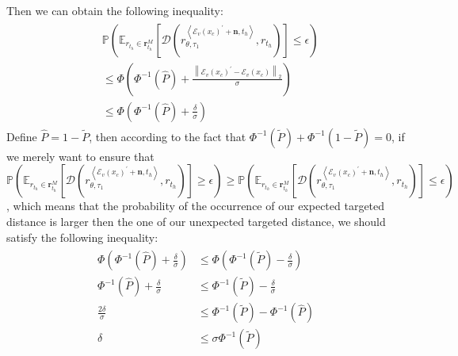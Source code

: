 Then we can obtain the following inequality:
\begin{align}
\begin{split}
&\mathbb{P}(\mathbb{E}_{r_{t_h}\in\mathbf{r}_{t_h}^M}[\mathcal{D}(r_{\theta, \tau_1}^{\left<\mathcal{E}_v(x_c)^{\prime}+\mathbf{n}, t_h\right>}, r_{t_h})]\leq\epsilon)\\&\leq\Phi(\Phi^{-1}(\hat{P})+\frac{\left\|\mathcal{E}_v(x_c)^{\prime}-\mathcal{E}_v(x_c)\right\|_2}{\sigma})\\
&\leq\Phi(\Phi^{-1}(\hat{P})+
\frac{\delta}{\sigma})
\end{split}
\end{align}
Define $\hat{P} = 1 - \tilde{P}$, then according to the fact that $\Phi^{-1}(\tilde{P})+\Phi^{-1}(1-\tilde{P})=0$, if we merely want to ensure that $\mathbb{P}(\mathbb{E}_{r_{t_h}\in\mathbf{r}_{t_h}^M}[\mathcal{D}(r_{\theta, \tau_1}^{\left<\mathcal{E}_v(x_c)^{\prime}+\mathbf{n}, t_h\right>}, r_{t_h})]\geq\epsilon)\geq\mathbb{P}(\mathbb{E}_{r_{t_h}\in\mathbf{r}_{t_h}^M}[\mathcal{D}(r_{\theta, \tau_1}^{\left<\mathcal{E}_v(x_c)^{\prime}+\mathbf{n}, t_h\right>}, r_{t_h})]\leq\epsilon)$, which means that the probability of the occurrence of our expected targeted distance is larger then the one of our unexpected targeted distance, we should satisfy the following inequality:
\begin{align}
\begin{split}
\Phi(\Phi^{-1}(\hat{P})+
\frac{\delta}{\sigma})&\leq\Phi(
\Phi^{-1}(\tilde{P})-\frac{\delta}{\sigma})\\
\Phi^{-1}(\hat{P})+
\frac{\delta}{\sigma}&\leq\Phi^{-1}(\tilde{P})-\frac{\delta}{\sigma}\\
\frac{2\delta}{\sigma}&\leq\Phi^{-1}(\tilde{P})-\Phi^{-1}(\hat{P})\\
\delta&\leq\sigma\Phi^{-1}(\tilde{P})
\end{split}
\end{align}

